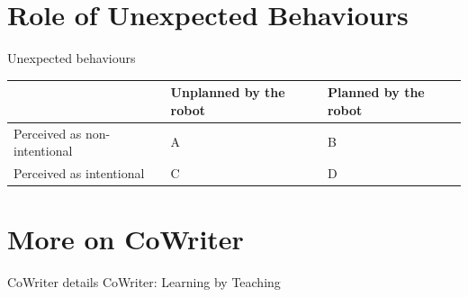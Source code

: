 \documentclass[compress]{beamer}
\begin{document}
{%
\section[Unexpected Behaviours]{Role of Unexpected Behaviours}

\begin{frame}{Unexpected behaviours}

    \centering
    \begin{tabular}{  >{\centering\arraybackslash}m{2cm} | >{\centering\arraybackslash}m{2cm} | >{\centering\arraybackslash}m{2cm} }
        & Unplanned by the robot & Planned by the robot \\ \hline
        Perceived as non-intentional & A  & B  \\ \hline
        Perceived as intentional &  C & D 
    \end{tabular}


\end{frame}


\section[CoWriter]{More on CoWriter}

\begin{frame}{CoWriter details}
    \centering
    CoWriter: Learning by Teaching\\





\end{frame}}
\end{document}
